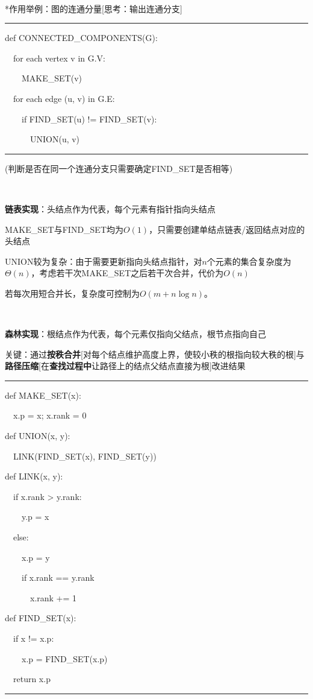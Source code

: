 \documentclass[a4paper,UTF8,fontset=windows]{ctexart}
\newenvironment{code}{\rule{36em}{0.1em}\setlength{\parindent}{1em}

}{

\setlength{\parindent}{0em}\rule{36em}{0.1em}}
\begin{document}
\

*\hspace{0em}作用举例：图的连通分量[思考：输出连通分支]

\begin{code}
def CONNECTED\_COMPONENTS(G):

\ \ for each vertex v in G.V:

\ \ \ \ MAKE\_SET(v)

\ \ for each edge (u, v) in G.E:

\ \ \ \ if FIND\_SET(u) != FIND\_SET(v):

\ \ \ \ \ \ UNION(u, v)
\end{code}

(判断是否在同一个连通分支只需要确定FIND\_SET是否相等)

\

\textbf{链表实现}：头结点作为代表，每个元素有指针指向头结点

MAKE\_SET与FIND\_SET均为$O(1)$，只需要创建单结点链表/返回结点对应的头结点

UNION较为复杂：由于需要更新指向头结点指针，对$n$个元素的集合复杂度为$\Theta(n)$，考虑若干次MAKE\_SET之后若干次合并，代价为$O(n)$

若每次用短合并长，复杂度可控制为$O(m+n\log n)$。

\

\textbf{森林实现}：根结点作为代表，每个元素仅指向父结点，根节点指向自己

关键：通过\textbf{按秩合并}[对每个结点维护高度上界，使较小秩的根指向较大秩的根]与\textbf{路径压缩}[在\textbf{查找过程中}让路径上的结点父结点直接为根]改进结果

\begin{code}
def MAKE\_SET(x):

\ \ x.p = x; x.rank = 0

def UNION(x, y):

\ \ LINK(FIND\_SET(x), FIND\_SET(y))

def LINK(x, y):

\ \ if x.rank > y.rank:

\ \ \ \ y.p = x

\ \ else:

\ \ \ \ x.p = y

\ \ \ \ if x.rank == y.rank

\ \ \ \ \ \ x.rank += 1

def FIND\_SET(x):

\ \ if x != x.p:

\ \ \ \ x.p = FIND\_SET(x.p)

\ \ return x.p
\end{code}
\end{document}
